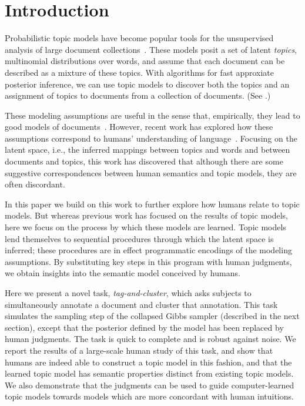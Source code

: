 \section{Introduction}
Probabilistic topic models have become popular tools for the
unsupervised analysis of large document
collections~\cite{deerwester-90,griffiths02probabilistic,blei-09}.
These models posit a set of latent \emph{topics}, multinomial
distributions over words, and assume that each document can be
described as a mixture of these topics.  With algorithms for fast
approxiate posterior inference, we can use topic models to discover
both the topics and an assignment of topics to documents from a
collection of documents.  (See .)

These modeling assumptions are useful in the sense that, empirically,
they lead to good models of documents~\cite{wallach-09}.  However,
recent work has explored how these assumptions correspond to humans'
understanding of language~\cite{Chang:2009fk,griffiths-06,mei-07}.  Focusing
on the latent space, i.e., the inferred mappings between topics and
words and between documents and topics, this work has discovered that
although there are some suggestive correspondences between human
semantics and topic models, they are often discordant.

In this paper we build on this work to further explore how humans
relate to topic models.  But whereas previous work has focused on
the results of topic models, here we focus on the process by which
these models are learned.  Topic models lend themselves to sequential
procedures through which the latent space is inferred; these
procedures are in effect programmatic encodings of the modeling
assumptions.  By substituting key steps in this program with human
judgments, we obtain insights into the semantic model conceived by
humans.

Here we present a novel task, \emph{tag-and-cluster}, which asks
subjects to simultaneously annotate a document and cluster that
annotation.  This task simulates the sampling step of the collapsed
Gibbs sampler (described in the next section), except that the
posterior defined by the model has been replaced by human judgments.
The task is quick to complete and is robust against noise.  We report
the results of a large-scale human study of this task, and show that
humans are indeed able to construct a topic model in this fashion, and
that the learned topic model has semantic properties distinct from
existing topic models.  We also demonstrate that the judgments can be
used to guide computer-learned topic models towards models which are
more concordant with human intuitions.
